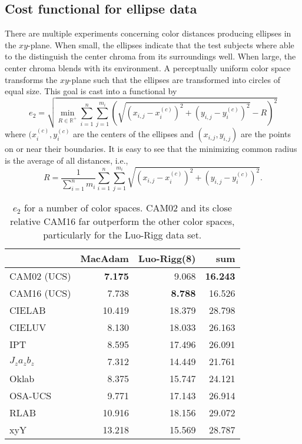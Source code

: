 \documentclass{scrartcl}
\theoremstyle{named}
\newcommand\R{\ensuremath{\mathbb{R}}}
\begin{document}
\subsection{Cost functional for ellipse data}

There are multiple experiments concerning color distances producing ellipses in
the $xy$-plane.
When small, the ellipses indicate that the test subjects where able to the distinguish
the center chroma from its surroundings well. When large, the center chroma blends with
its environment. A perceptually uniform color space transforms the $xy$-plane such that
the ellipses are transformed into circles of equal size. This goal is cast into a
functional by
\[
  e_2
  = \sqrt{\min_{R\in\R^+} \sum_{i=1}^n \sum_{j=1}^{m_i} \left(
  \sqrt{\left(x_{i,j} - x^{(c)}_i\right)^2 + \left(y_{i,j} - y^{(c)}_i\right)^2} - R
  \right)^2}
\]
where $(x^{(c)}_i, y^{(c)}_i$ are the centers of the ellipses and $(x_{i,j}, y_{i,j})$
are the points on or near their boundaries. It is easy to see that the minimizing common
radius is the average of all distances, i.e.,
\[
  R = \frac{1}{\sum_{i=1}^n m_i} \sum_{i=1}^n \sum_{j=1}^{m_i} \sqrt{\left(x_{i,j} -
  x^{(c)}_i\right)^2 + \left(y_{i,j} - y^{(c)}_i\right)^2}.
\]


\begin{table}
  \centering
  \begin{tabular}{lrrr}
    \toprule
    & MacAdam & Luo-Rigg(8) & sum\\
    \midrule
CAM02 (UCS)   & \textbf{7.175} &         9.068  & \textbf{16.243}\\
CAM16 (UCS)   &         7.738  & \textbf{8.788} &         16.526\\
CIELAB        &        10.419  &        18.379  &         28.798\\
CIELUV        &         8.130  &        18.033  &         26.163\\
IPT           &         8.595  &        17.496  &         26.091\\
$J_z a_z b_z$ &         7.312  &        14.449  &         21.761\\
Oklab         &         8.375  &        15.747  &         24.121\\
OSA-UCS       &         9.771  &        17.143  &         26.914\\
RLAB          &        10.916  &        18.156  &         29.072\\
xyY           &        13.218  &        15.569  &         28.787\\
    \bottomrule
  \end{tabular}
  \caption{$e_2$ for a number of color spaces. CAM02 and its close relative CAM16
  far outperform the other color spaces, particularly for the Luo-Rigg data set.}
\end{table}




\end{document}
